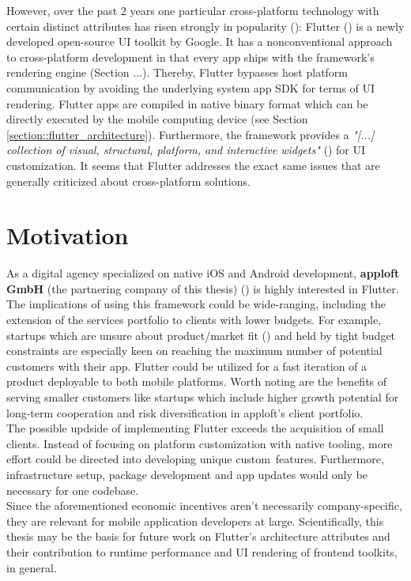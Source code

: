 However, over the past 2 years one particular cross-platform technology with certain distinct attributes has risen strongly in popularity (\cite{Statista2021}):
Flutter (\cite{FlutterDev20}) is a newly developed open-source UI toolkit by Google. 
It has a nonconventional approach to cross-platform development in that every app ships with the framework's rendering engine (Section ...). 
Thereby, Flutter bypasses host platform communication by avoiding the underlying system app SDK for terms of UI rendering.
Flutter apps are compiled in native binary format which can be directly executed by the mobile computing device (see Section \ref{section::flutter_architecture}).
Furthermore, the framework provides a \textit{"[...] collection of visual, structural, platform, and interactive widgets"} (\textcite{GoogleWidgets2021}) for UI customization.
It seems that Flutter addresses the exact same issues that are generally criticized about cross-platform solutions.

\section{Motivation}
\label{section:motivation}
As a digital agency specialized on native iOS and Android development, \textbf{apploft GmbH} 
(the partnering company of this thesis) (\cite{apploft2021}) is highly interested in Flutter. 
The implications of using this framework could be wide-ranging, including the extension of the services portfolio
to clients with lower budgets.
For example, startups which are unsure about product/market fit (\cite{Andreesen2007}) and held by tight budget constraints are especially keen on reaching 
the maximum number of potential customers with their app. Flutter could be utilized for a fast iteration of a product deployable to 
both mobile platforms. 
Worth noting are the benefits of serving smaller customers like startups which include higher growth potential for long-term cooperation
and risk diversification in apploft's client portfolio.\\
The possible updside of implementing Flutter exceeds the acquisition of small clients. Instead of focusing on platform customization with native tooling, more effort could 
be directed into developing unique custom features.
Furthermore, infrastructure setup, package development and app updates would only be necessary for one codebase.\\
Since the aforementioned economic incentives aren't necessarily company-specific, they are relevant for mobile application developers at large.
Scientifically, this thesis may be the basis for future work on Flutter's architecture attributes and their contribution to runtime performance and UI rendering of frontend toolkits, in general.

